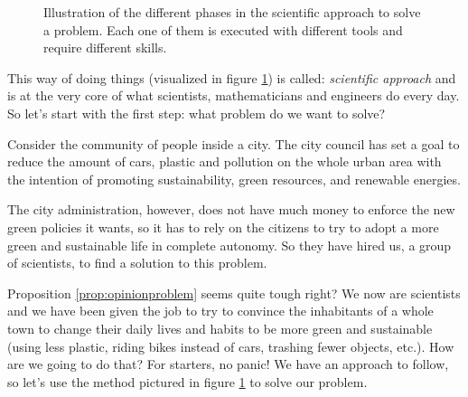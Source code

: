 %
\begin{figure}[b]
\centering

%
%
\caption[Phases of problem solving]{Illustration of the different phases in the scientific approach to solve a problem.
Each one of them is executed with different tools and require different skills.}
\label{fig:sciappr}
\end{figure}
%

This way of doing things (visualized in figure \ref{fig:sciappr})
is called: \textit{scientific approach} and is at the very core
of what scientists, mathematicians and engineers do every day. So let's start
with the first step: what problem do we want to solve?

\begin{proposition}
\label{prop:opinionproblem}
Consider the community of people inside a city. The city council has set a goal to reduce
the amount of cars, plastic and pollution on the whole urban area with the intention of
promoting sustainability, green resources, and renewable energies.

The city administration, however, does not have much money to enforce the new green policies
it wants, so it has to rely on the citizens to try to adopt a more green and sustainable life
in complete autonomy. So they have hired us, a group of scientists, to find a solution to
this problem.
\end{proposition}

Proposition \ref{prop:opinionproblem} seems quite tough right? We now are scientists and we
have been given the job to try to convince the inhabitants of a whole town to change their
daily lives and habits to be more green and sustainable (using less plastic, riding bikes instead of
cars, trashing fewer objects, etc.). How are we going to do that?
For starters, no panic! We have an approach to follow, so let's use the method pictured in figure
\ref{fig:sciappr} to solve our problem.\\

